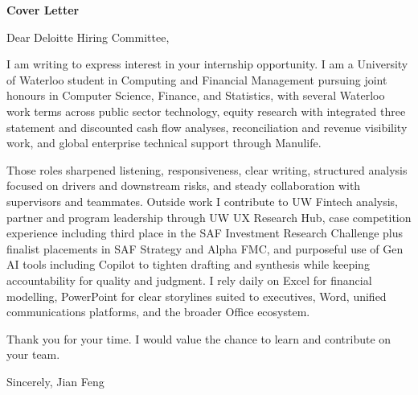 \documentclass{article}
\begin{document}
\begin{center}
\textbf{Cover Letter}
\end{center}
\vspace{0.5cm}
\vspace{0.5cm}
Dear Deloitte Hiring Committee, \newline

\vspace{0.5cm}
I am writing to express interest in your internship opportunity. I am a University of Waterloo student in Computing and Financial Management pursuing joint honours in Computer Science, Finance, and Statistics, with several Waterloo work terms across public sector technology, equity research with integrated three statement and discounted cash flow analyses, reconciliation and revenue visibility work, and global enterprise technical support through Manulife.

Those roles sharpened listening, responsiveness, clear writing, structured analysis focused on drivers and downstream risks, and steady collaboration with supervisors and teammates. Outside work I contribute to UW Fintech analysis, partner and program leadership through UW UX Research Hub, case competition experience including third place in the SAF Investment Research Challenge plus finalist placements in SAF Strategy and Alpha FMC, and purposeful use of Gen AI tools including Copilot to tighten drafting and synthesis while keeping accountability for quality and judgment. I rely daily on Excel for financial modelling, PowerPoint for clear storylines suited to executives, Word, unified communications platforms, and the broader Office ecosystem.

Thank you for your time. I would value the chance to learn and contribute on your team.

\vspace{0.5cm}
Sincerely, \newline
Jian Feng
\end{document}
